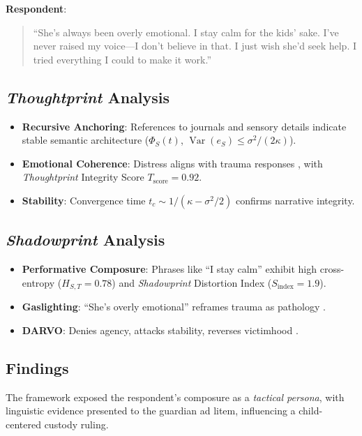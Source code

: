 \documentclass[11pt]{article}
\newcommand{\thoughtprint}{\textit{Thoughtprint}}
\newcommand{\shadowprint}{\textit{Shadowprint}}
\begin{document}
\textbf{Respondent}:  
\begin{quote}
``She’s always been overly emotional. I stay calm for the kids’ sake. I’ve never raised my voice—I don’t believe in that. I just wish she’d seek help. I tried everything I could to make it work.''
\end{quote}

\subsection{\thoughtprint{} Analysis}
\begin{itemize}
    \item \textbf{Recursive Anchoring}: References to journals and sensory details indicate stable semantic architecture (\(\Phi_S(t)\), \(\operatorname{Var}(e_S) \leq \sigma^2/(2\kappa)\)).
    \item \textbf{Emotional Coherence}: Distress aligns with trauma responses \citep{herman1992}, with \thoughtprint{} Integrity Score \(T_{\text{score}} = 0.92\).
    \item \textbf{Stability}: Convergence time \(t_c \sim 1/(\kappa - \sigma^2/2)\) confirms narrative integrity.
\end{itemize}

\subsection{\shadowprint{} Analysis}
\begin{itemize}
    \item \textbf{Performative Composure}: Phrases like ``I stay calm'' exhibit high cross-entropy (\(H_{S,T} = 0.78\)) and \shadowprint{} Distortion Index (\(S_{\text{index}} = 1.9\)).
    \item \textbf{Gaslighting}: ``She’s overly emotional'' reframes trauma as pathology \citep{stark2007}.
    \item \textbf{DARVO}: Denies agency, attacks stability, reverses victimhood \citep{freyd1997}.
\end{itemize}

\subsection{Findings}
The framework exposed the respondent’s composure as a \textit{tactical persona}, with linguistic evidence presented to the guardian ad litem, influencing a child-centered custody ruling.
\end{document}

